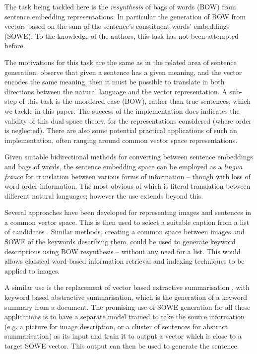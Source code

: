 \documentclass{book}
\begin{document}
The task being tackled here is the \emph{resynthesis} of bags of words (BOW) from sentence embedding representations. In particular the generation of BOW from vectors based on the sum of the sentence's constituent words' embeddings (SOWE). To the knowledge of the authors, this task has not been attempted before.

The motivations for this task are the same as in the related area of sentence generation. \textcite{Dinu2014CompositionalGeneration} observe that given  a sentence has a given meaning, and the vector encodes the same meaning, then it must be possible to translate in both directions between the natural language and the vector representation. A sub-step of this task is the unordered case (BOW), rather than true sentences, which we tackle in this paper. The success of the implementation does indicates the validity of this dual space theory, for the representations considered (where order is neglected).  There are also some potential practical applications of such an implementation, often ranging around common vector space representations.

Given suitable bidirectional methods for converting between sentence embeddings and bags of words, the sentence embedding space can be employed as a \emph{lingua franca} for translation between various forms of information -- though with loss of word order information. The most obvious of which is literal translation between different natural languages; however the use extends beyond this.

Several approaches have been developed for representing images and sentences in a common vector space. This is then used to select a suitable caption from a list of candidates \parencite{farhadi2010every,socherDTRNN}. Similar methods, creating a common space between images and SOWE of the keywords describing them, could be used to generate keyword descriptions using BOW resynthesis -- without any need for a list. This would allows classical word-based information retrieval and indexing techniques to be applied to images.

A similar use is the replacement of vector based extractive summarisation \parencite{KaagebExtractiveSummaristation,yogatamaextractive}, with keyword based abstractive summarisation, which is the generation of a keyword summary from a document. The promising use of SOWE generation for all these applications is to have a separate model trained to take the source information (e.g. a picture for image description, or a cluster of sentences for abstract summarisation) as its input and train it to output a vector which is close to a target SOWE vector. This output can then be used to generate the sentence.
\end{document}
